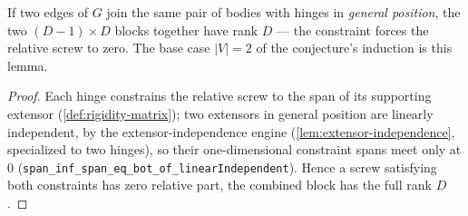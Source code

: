 \begin{lemma}
  \label{lem:rank-parallel-full}
  \leanok
  If two edges of $G$ join the same pair of bodies with hinges in
  \emph{general position}, the two $(D-1) \times D$ blocks together have
  rank $D$ --- the constraint forces the relative screw to zero. The
  base case $|V| = 2$ of the conjecture's induction is this lemma.
\end{lemma}
\begin{proof}
  \leanok
  Each hinge constrains the relative screw to the span of its supporting
  extensor (\cref{def:rigidity-matrix}); two extensors in general
  position are linearly independent, by the extensor-independence engine
  (\cref{lem:extensor-independence}, specialized to two hinges), so their
  one-dimensional constraint spans meet only at $0$
  (\texttt{span\_inf\_span\_eq\_bot\_of\_linearIndependent}). Hence a
  screw satisfying both constraints has zero relative part, the combined
  block has the full rank $D$.
\end{proof}

